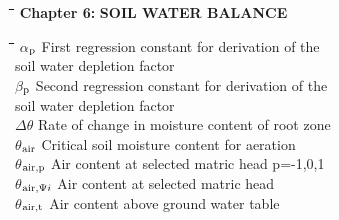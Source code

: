 \documentclass[11pt]{article}
\begin{document}
\newpage
\begin{tabbing}
\hspace{1.27cm}\=\hspace{1.27cm}\=\hspace{1.27cm}\=\hspace{1.27cm}\=%
\hspace{1.27cm}\=\hspace{1.27cm}\=\hspace{1.27cm}\=\hspace{1.27cm}\=%
\hspace{1.27cm}\=\hspace{1.27cm}\=\kill
{\bf {\large Chapter 6:}}\> \> \> {\bf {\large SOIL WATER BALANCE}}
\end{tabbing}
\nwln
\begin{tabbing}
\hspace{1.27cm}\=\hspace{1.27cm}\=\hspace{1.27cm}\=\hspace{1.27cm}\=%
\hspace{1.27cm}\=\hspace{1.27cm}\=\hspace{1.27cm}\=\hspace{1.27cm}\=%
\hspace{1.27cm}\=\hspace{1.27cm}\=\kill
$\alpha$$_{{\rm p}}$\> \> First regression constant for derivation of the \\
\>\> soil water depletion factor\> \> \> \> \> \> \> \> [-]\\
$\beta$$_{{\rm p}}$\> \> Second regression constant for derivation of the\\
\>\> soil water depletion factor\> \> \> \> \> \> \> \> [-]\\
$\Delta$$\theta$\> \> Rate of change in moisture content of root zone\> \> \> \> \> \> \> \> [cm$^{{\rm 3}}$ cm$^{{\rm -3}}$ d$^{{\rm -1}}$]\\
$\theta$$_{{\rm air}}$\> \> Critical soil moisture content for aeration\> \> \> \> \> \> \> \> [cm$^{{\rm 3}}$ cm$^{{\rm -3}}$]\\
$\theta$$_{{\rm air,p}}$\> \> Air content at selected matric head p=-1,0,1\> \> \> \> \> \> \> \> [cm$^{{\rm 3}}$ cm$^{{\rm -3}}$]\\
$\theta$$_{{\rm air,}{\rm \Psi}{i}}$\> \> Air content at selected matric head\> \> \> \> \> \> \> \> [cm$^{{\rm 3}}$ cm$^{{\rm -3}}$]\\
$\theta$$_{{\rm air,t}}$\> \> Air content above ground water table\> \> \> \> \> \> \> \> [cm$^{{\rm 3}}$ cm$^{{\rm -3}}$]\\
$$
\end{tabbing}
\end{document}
